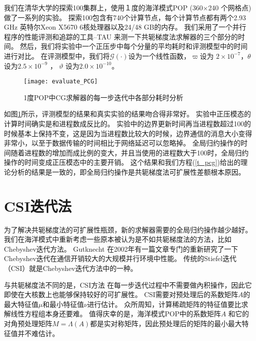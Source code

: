  
我们在清华大学的探索100集群上，使用１度的海洋模式POP (360$\times$240 个网格点)做了一系列的实验。 
探索100包含有740个计算节点，每个计算节点都有两个2.93 GHz 英特尔Xeon X5670 6核处理器以及24/48 GB的内存。 
我们采用了一个并行程序的性能评测和追踪的工具--TAU\cite{shende2006tau} 来测一下共轭梯度法求解器的三个部分的时间。 
然后，我们将实验中一个正压步中每个分量的平均耗时和评测模型中的时间进行对比。 
在评测模型中，我们将$\mathcal{G}(\cdot)$设为一个线性函数，$\varpi$设为 $2\times 10^{-7}$，$\theta$ 设为$2.5\times 10^{-9}$ ， $\vartheta$  设为$2.0\times 10^{-10}$。 


\begin{figure}[ht]
\centering
\texttt{[image: evaluate\_PCG]}
\caption[] {1度POP中CG求解器的每一步迭代中各部分耗时分析\label{fig:pcg_ratio}}
\end{figure}
如图\ref{fig:pcg_ratio}所示，评测模型的结果和真实实验的结果吻合得非常好。 
实验中正压模态的计算时间确实是和进程数成反比的。 
实验中的边界更新时间再当进程数超过100的时候基本上保持不变，这是因为当进程数比较大的时候，边界通信的消息大小变得非常小，以至于数据传输的时间相比于网络延迟可以忽略掉。 
全局归约操作的时间随着进程数的增加而成比例的变大，并且当使用的进程数大于100时，全局归约操作的时间变成正压模态中的主要开销。 
这个结果和我们方程(\ref{t_pcg})给出的理论分析的结果是一致的，即全局归约操作是共轭梯度法可扩展性差额根本原因。 


 
\section{CSI迭代法}
\label{solver:csi}

为了解决共轭梯度法的可扩展性瓶颈，新的求解器需要的全局归约操作越少越好。 
我们在海洋模式中重新考虑一些原本被认为是不如共轭梯度法的方法，比如Chebyshev迭代方法。 
Gutknecht \cite{gutknecht2002chebyshev} 在2002年有一篇文章专门的重新研究了一下Chebyshev迭代在通信开销较大的大规模并行环境中性能。 
传统的Stiefel迭代（CSI）就是Chebyshev迭代方法中的一种。 

与共轭梯度法不同的是，CSI方法 在每一步迭代过程中不需要做內积操作，因此它即使在大核数上也能够保持较好的可扩展性。
CSI需要对预处理后的系数矩阵$A$的最大特征值$\mu$和最小特征值$\nu$进行估计。 
众所周知，计算稀疏矩阵的特征值要比求解线性方程组本身还要难。 
值得庆幸的是，海洋模式POP中的系数矩阵$A$ 和它的对角预处理矩阵$M = \Lambda(A)$都是实对称矩阵，因此预处理后的矩阵的最小最大特征值并不难估计。 
 
